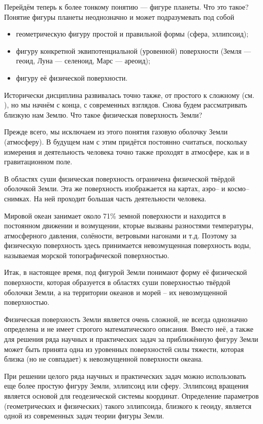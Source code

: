 \documentclass[11pt, a4paper]{article}
\theoremstyle{plain}
\theoremstyle{definition}
\theoremstyle{remark}
\begin{document}
Перейдём теперь к более тонкому понятию --- фигуре планеты. Что это такое? 
Понятие фигуры планеты неоднозначно и может подразумевать под собой
\begin{itemize}
    \item геометрическую фигуру простой и правильной формы (сфера, эллипсоид);
    \item фигуру конкретной эквипотенциальной (уровенной) поверхности (Земля --- геоид, Луна ---
        селеноид, Марс --- ареоид);
    \item фигуру её физической поверхности.
\end{itemize}
Исторически дисциплина развивалась точно также, от простого к сложному (см.
\cite{Ogorodova2013,Yuzefovich2014}), но мы начнём с конца, с современных взглядов. 
Снова будем рассматривать близкую нам Землю. Что такое физическая поверхность Земли?

Прежде всего, мы исключаем из этого понятия газовую оболочку Земли (атмосферу). В будущем нам с этим
придётся постоянно считаться, поскольку измерения и деятельность человека точно также проходят в
атмосфере, как и в гравитационном поле.

В областях суши физическая поверхность ограничена физической твёрдой оболочкой Земли. Эта же
поверхность изображается на картах, аэро-- и космо-- снимках. На ней проходит большая часть
деятельности человека. 

Мировой океан занимает около 71\% земной поверхности и находится в постоянном движении и
возмущении, кторые вызваны разностями температуры, атмосферного давления, солёности,
ветровыми нагонами и т.д. Поэтому за физическую поверхность здесь принимается невозмущенная поверхность
воды, называемая морской топографической поверхностью. 

Итак, в настоящее время, под фигурой Земли понимают форму её физической поверхности, которая
образуется в областях суши поверхностью твёрдой оболочки Земли, а на территории океанов и
морей -- их невозмущенной поверхностью. 

Физическая поверхность Земли является очень сложной, не всегда однозначно определена и не имеет 
строгого математического описания.
Вместо неё, а также для решения ряда научных и практических задач за приближённую фигуру 
Земли может быть принята
одна из уровенных поверхностей силы тяжести, которая близка (но не совпадает) к невозмущенной поверхности океана.

При решении целого ряда научных и практических задач можно использовать еще более простую фигуру
Земли, эллипсоид или сферу. Эллипсоид вращения является основой для геодезической системы координат. 
Определение параметров (геометрических и физических) такого эллипсоида, близкого к геоиду, является одной из
современных задач теории фигуры Земли.
\end{document}

